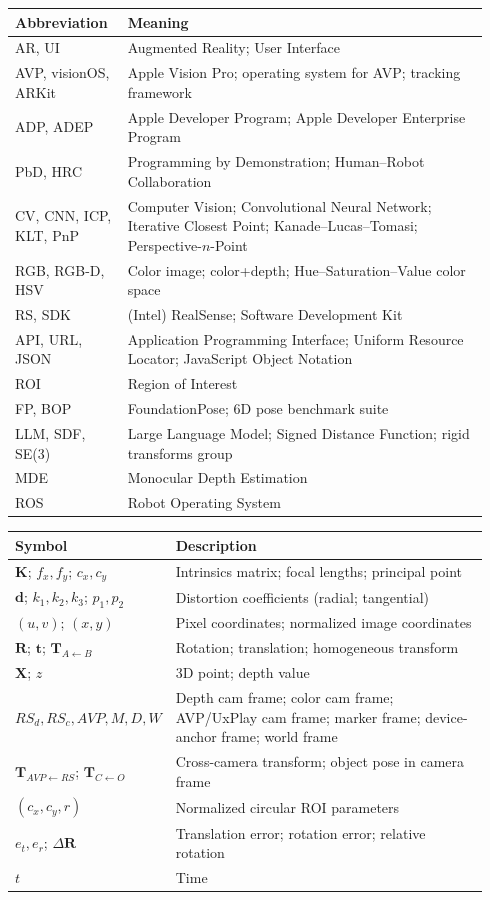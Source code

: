 \setlength{\tabcolsep}{4mm}
\renewcommand{\arraystretch}{1.08}
\small
\begin{longtable}{p{0.22\linewidth}p{0.72\linewidth}}
\textbf{Abbreviation} & \textbf{Meaning} \\
\hline
AR, UI & Augmented Reality; User Interface \\
AVP, visionOS, ARKit & Apple Vision Pro; operating system for AVP; tracking framework \\
ADP, ADEP & Apple Developer Program; Apple Developer Enterprise Program \\
PbD, HRC & Programming by Demonstration; Human--Robot Collaboration \\
CV, CNN, ICP, KLT, PnP & Computer Vision; Convolutional Neural Network; Iterative Closest Point; Kanade--Lucas--Tomasi; Perspective-$n$-Point \\
RGB, RGB-D, HSV & Color image; color+depth; Hue--Saturation--Value color space \\
RS, SDK & (Intel) RealSense; Software Development Kit \\
API, URL, JSON & Application Programming Interface; Uniform Resource Locator; JavaScript Object Notation \\
ROI & Region of Interest \\
FP, BOP & FoundationPose; 6D pose benchmark suite \\
LLM, SDF, SE(3) & Large Language Model; Signed Distance Function; rigid transforms group \\
MDE & Monocular Depth Estimation \\
ROS & Robot Operating System \\
\end{longtable}
\normalsize

\setlength{\tabcolsep}{4mm}
\renewcommand{\arraystretch}{1.08}
\small
\begin{longtable}{p{0.28\linewidth}p{0.66\linewidth}}
\textbf{Symbol} & \textbf{Description} \\
\hline
$\mathbf{K}$; $f_x,f_y$; $c_x,c_y$ & Intrinsics matrix; focal lengths; principal point \\
$\mathbf{d}$; $k_1,k_2,k_3$; $p_1,p_2$ & Distortion coefficients (radial; tangential) \\
$(u,v)$; $(x,y)$ & Pixel coordinates; normalized image coordinates \\
$\mathbf{R}$; $\mathbf{t}$; $\mathbf{T}_{A\leftarrow B}$ & Rotation; translation; homogeneous transform \\
$\mathbf{X}$; $z$ & 3D point; depth value \\
$RS_d, RS_c, AVP, M, D, W$ & Depth cam frame; color cam frame; AVP/UxPlay cam frame; marker frame; device-anchor frame; world frame \\
$\mathbf{T}_{AVP\leftarrow RS}$; $\mathbf{T}_{C\leftarrow O}$ & Cross-camera transform; object pose in camera frame \\
$(c_x,c_y,r)$ & Normalized circular ROI parameters \\
$e_t, e_r$; $\Delta\mathbf{R}$ & Translation error; rotation error; relative rotation \\
$t$ & Time \\
\end{longtable}
\normalsize
